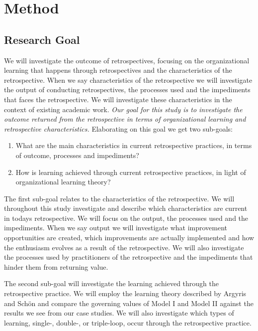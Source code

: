 \section{Method}
\subsection{Research Goal}
 We will investigate the outcome of retrospectives, focusing on the organizational learning that happens through retrospectives and the characteristics of the retrospective. When we say characteristics of the retrospective we will investigate the output of conducting retrospectives, the processes used and the impediments that faces the retrospective. We will investigate these characteristics in the context of existing academic work. \textit{Our goal for this study is to investigate the outcome returned from the retrospective in terms of organizational learning and retrospective characteristics.} Elaborating on this goal we get two sub-goals: 

\begin{enumerate}
	\item What are the main characteristics in current retrospective practices, in terms of outcome, processes and impediments? 
	\item How is learning achieved through current retrospective practices, in light of organizational learning theory? 
\end{enumerate}

The first sub-goal relates to the characteristics of the retrospective. We will throughout this study investigate and describe which characteristics are current in todays retrospective. We will focus on the output, the processes used and the impediments. When we say output we will investigate what improvement opportunities are created, which improvements are actually implemented and how the enthusiasm evolves as a result of the retrospective. We will also investigate the processes used by practitioners of the retrospective and the impediments that hinder them from returning value. 

The second sub-goal will investigate the learning achieved through the retrospective practice. We will employ the learning theory described by Argyris and Schön \cite{Argyris1996} and compare the governing values of Model I and Model II against the results we see from our case studies. We will also investigate which types of learning, single-, double-, or triple-loop, occur through the retrospective practice. 

